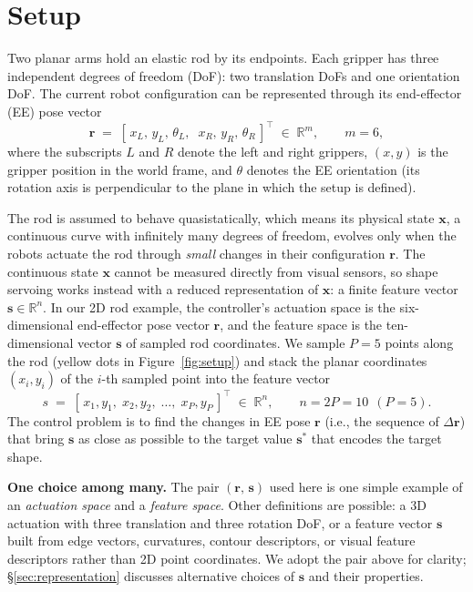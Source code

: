 \documentclass[11pt,a4paper]{article}
\begin{document}
\section{Setup}
\label{sec:setup}

Two planar arms hold an elastic rod by its endpoints. Each gripper has three independent
degrees of freedom (DoF): two translation DoFs and one orientation DoF. The current robot configuration can be 
represented through its end-effector (EE) pose vector
\[
    \mathbf{r} \;=\; [\,x_L,\, y_L,\, \theta_L,\;\; x_R,\, y_R,\, \theta_R\,]^{\top} \;\in\; \mathbb{R}^{m},
    \qquad m = 6,
\]
where the subscripts $L$ and $R$ denote the left and right grippers, $(x,y)$ is the gripper
position in the world frame, and $\theta$ denotes the EE orientation (its rotation axis is
perpendicular to the plane in which the setup is defined).

The rod is assumed to behave quasistatically, which means its physical state $\mathbf{x}$, a
continuous curve with infinitely many degrees of freedom, evolves only when the robots actuate
the rod through \textit{small} changes in their configuration $\mathbf{r}$. The continuous state
$\mathbf{x}$ cannot be measured directly from visual sensors, so shape servoing works instead with a
reduced representation of $\mathbf{x}$: a finite feature vector $\mathbf{s}\in\mathbb{R}^{n}$. In our 2D rod
example, the controller's actuation space is the six-dimensional end-effector pose vector
$\mathbf{r}$, and the feature space is the ten-dimensional vector $\mathbf{s}$ of sampled rod coordinates. We
sample $P=5$ points
along the rod (yellow dots in Figure~\ref{fig:setup}) and stack the planar coordinates
$(x_i,y_i)$ of the $i$-th sampled point into the feature vector
\[
    s \;=\; [\,x_1, y_1,\; x_2, y_2,\; \dots,\; x_P, y_P\,]^{\top} \;\in\; \mathbb{R}^{n},
    \qquad n = 2P = 10 \ \ (P=5).
\]
The control problem is to find the changes in EE pose $\mathbf{r}$ (i.e., the sequence of $\Delta\mathbf{r}$) that bring $\mathbf{s}$ as close as possible to the target value $\mathbf{s}^{*}$ that encodes the target shape.

\begin{tcolorbox}[notebox]
\textbf{One choice among many.} The pair $(\mathbf{r},\,\mathbf{s})$ used here is one simple example of an
\emph{actuation space} and a \emph{feature space}. Other definitions are possible: a 3D
actuation with three translation and three rotation DoF, or a feature vector $\mathbf{s}$ built
from edge vectors, curvatures, contour descriptors, or visual feature descriptors rather
than 2D point coordinates. We adopt the pair above for clarity;
\S\ref{sec:representation} discusses alternative choices of $\mathbf{s}$ and their properties.
\end{tcolorbox}
\end{document}
